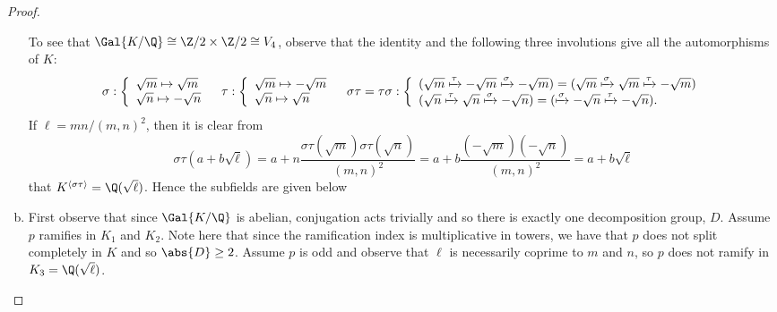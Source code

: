 \documentclass[10pt]{amsart}
\begin{document}
\begin{thm}
\begin{proof}
\begin{enumerate}[(a)]
        To see that $\Gal{K/\Q} \cong \Z/2 \times \Z/2 \cong V_4$, observe that the identity and the following three involutions give all the automorphisms of $K$:
        $$
        \begin{array}{ccc}
          \sigma : \left\{
          \begin{array}{l}
            \sqrt{m} \mapsto \sqrt{m}\\
            \sqrt{n} \mapsto -\sqrt{n}
            \end{array}
          \right.
          &
          \tau : \left\{
          \begin{array}{l}
            \sqrt{m} \mapsto -\sqrt{m}\\
            \sqrt{n} \mapsto \sqrt{n}
            \end{array}
          \right.
        &
        \sigma\tau = \tau\sigma : \left\{
          \begin{array}{l}
            (\sqrt{m} \xmapsto{\tau} -\sqrt{m} \xmapsto{\sigma} -\sqrt{m}) = (\sqrt{m} \xmapsto{\sigma} \sqrt{m} \xmapsto{\tau} -\sqrt{m})\\
            (\sqrt{n} \xmapsto{\tau} \sqrt{n} \xmapsto{\sigma} -\sqrt{n}) = (\xmapsto{\sigma} -\sqrt{n} \xmapsto{\tau} -\sqrt{n}).
            \end{array}
          \right.\\
          \end{array}
        $$
        If $\ell = mn/(m,n)^2$, then it is clear from 
        $$\sigma\tau(a + b\sqrt{\ell}) = a + n\frac{\sigma\tau(\sqrt{m})\sigma\tau(\sqrt{n})}{(m,n)^2} = a + b\frac{(-\sqrt{m})(-\sqrt{n})}{(m,n)^2} = a + b\sqrt{\ell}$$
        that $K^{\left<\sigma\tau\right>} = \Q(\sqrt{\ell})$.
        Hence the subfields are given below
        \begin{center}
    \end{center}
      \item
        First observe that since $\Gal{K/\Q}$ is abelian, conjugation acts trivially and so there is exactly one decomposition group, $D$.
        Assume $p$ ramifies in $K_1$ and $K_2$.
        Note here that since the ramification index is multiplicative in towers, we have that $p$ does not split completely in $K$ and so $\abs{D} \geq 2$.
        Assume $p$ is odd and observe that $\ell$ is necessarily coprime to $m$ and $n$, so $p$ does not ramify in $K_3 = \Q(\sqrt{\ell})$.
        

\end{enumerate}
\end{proof}
\end{thm}
\end{document}
